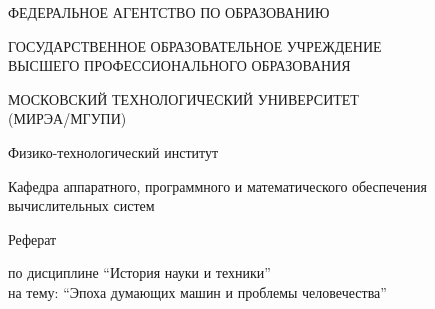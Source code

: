 \begin{titlepage}
\begin{center} %

\bfseries

{\large ФЕДЕРАЛЬНОЕ АГЕНТСТВО ПО ОБРАЗОВАНИЮ\\
  \par \medskip
  ГОСУДАРСТВЕННОЕ ОБРАЗОВАТЕЛЬНОЕ УЧРЕЖДЕНИЕ\\
  ВЫСШЕГО ПРОФЕССИОНАЛЬНОГО ОБРАЗОВАНИЯ\\
  \par \medskip
  МОСКОВСКИЙ ТЕХНОЛОГИЧЕСКИЙ УНИВЕРСИТЕТ\\
	(МИРЭА/МГУПИ)
	
	} %

\vspace{48pt}


	{\large 
	  Физико-технологический институт
	}


\vspace{36pt}


	{\large  {\comic Кафедра аппаратного, программного и математического обеспечения вычислительных систем}
	
	} %



        \LARGE{Реферат}
        
{\large	\DoloresCyr по дисциплине ``История науки и техники'' \\
  на тему: \LARGE{``Эпоха думающих машин и проблемы человечества''}
	
	}

\vspace{12pt}


\end{center}
\end{titlepage}
